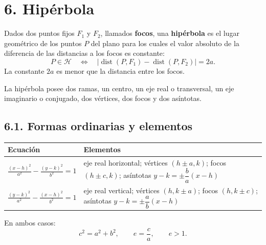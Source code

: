 \documentclass[11pt]{article}
\begin{document}
\section*{6. Hipérbola}

\begin{mdframed}[style=teoSty,frametitle={Definición de hipérbola}]
Dados dos puntos fijos $F_1$ y $F_2$, llamados \textbf{focos}, una \textbf{hipérbola} es el lugar geométrico de los puntos $P$ del plano para los cuales el valor absoluto de la diferencia de las distancias a los focos es constante:
\[
P\in\mathcal H
\quad\Longleftrightarrow\quad
\left|\operatorname{dist}(P,F_1)-\operatorname{dist}(P,F_2)\right|=2a.
\]
La constante $2a$ es menor que la distancia entre los focos.
\end{mdframed}

La hipérbola posee dos ramas, un centro, un eje real o transversal, un eje imaginario o conjugado, dos vértices, dos focos y dos asíntotas.

\subsection*{6.1. Formas ordinarias y elementos}

\begin{center}
\renewcommand{\arraystretch}{1.55}
\begin{tabular}{m{64mm}|m{84mm}}
\toprule
Ecuación & Elementos \\
\midrule
$\displaystyle \frac{(x-h)^2}{a^2}-\frac{(y-k)^2}{b^2}=1$
& eje real horizontal; vértices $(h\pm a,k)$; focos $(h\pm c,k)$; asíntotas $y-k=\pm\dfrac{b}{a}(x-h)$ \\
\midrule
$\displaystyle \frac{(y-k)^2}{a^2}-\frac{(x-h)^2}{b^2}=1$
& eje real vertical; vértices $(h,k\pm a)$; focos $(h,k\pm c)$; asíntotas $y-k=\pm\dfrac{a}{b}(x-h)$ \\
\bottomrule
\end{tabular}
\end{center}

En ambos casos:
\[
\boxed{c^2=a^2+b^2},
\qquad
\boxed{e=\frac{c}{a}},
\qquad e>1.
\]
\end{document}
